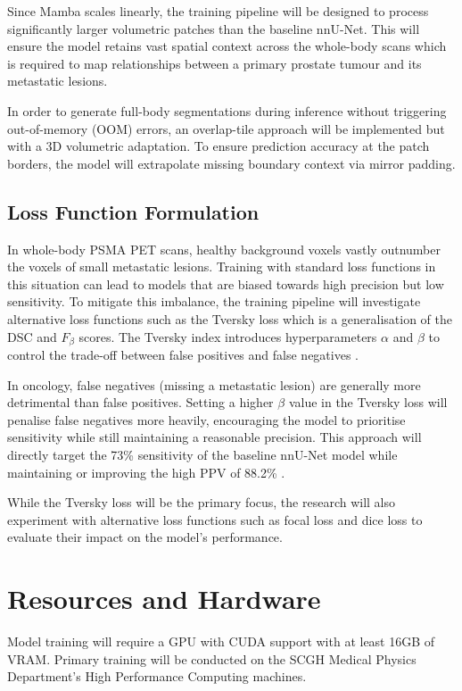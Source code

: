 \documentclass{article}
\begin{document}
Since Mamba scales linearly, the training pipeline will be designed to process significantly larger volumetric patches than the baseline 
nnU-Net. This will ensure the model retains vast spatial context across the whole-body scans which is required to map relationships between
a primary prostate tumour and its metastatic lesions.

In order to generate full-body segmentations during inference without triggering out-of-memory (OOM) errors, an overlap-tile approach will
be implemented \cite{ronneberger2015unet} but with a 3D volumetric adaptation. To ensure prediction accuracy at the patch borders, the 
model will extrapolate missing boundary context via mirror padding. 

\subsection{Loss Function Formulation}
In whole-body PSMA PET scans, healthy background voxels vastly outnumber the voxels of small metastatic lesions. Training with standard
loss functions in this situation can lead to models that are biased towards high precision but low sensitivity. To mitigate this 
imbalance, the training pipeline will investigate alternative loss functions such as the Tversky loss which is a generalisation of the 
DSC and $F_\beta$ scores. The Tversky index introduces hyperparameters $\alpha$ and $\beta$ to control the trade-off between false positives 
and false negatives \cite{salehi2017tversky}.

In oncology, false negatives (missing a metastatic lesion) are generally more detrimental than false positives. Setting a higher $\beta$ value 
in the Tversky loss will penalise false negatives more heavily, encouraging the model to prioritise sensitivity while still maintaining a 
reasonable precision. This approach will directly target the 73\% sensitivity of the baseline nnU-Net model while maintaining or improving 
the high PPV of 88.2\% \cite{kendrick2022fully}.

While the Tversky loss will be the primary focus, the research will also experiment with alternative loss functions such as focal loss and dice 
loss to evaluate their impact on the model's performance. 

\section{Resources and Hardware}
Model training will require a GPU with CUDA support with at least 16GB of VRAM. Primary training will be conducted on the SCGH Medical 
Physics Department's High Performance Computing machines. 
\end{document}
